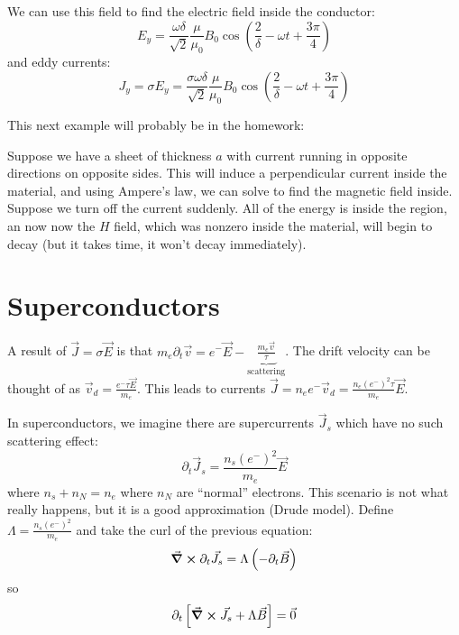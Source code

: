 \documentclass[a4paper,twoside,master.tex]{subfiles}
\begin{document}
We can use this field to find the electric field inside the conductor:
\begin{equation}
    E_y = \frac{\omega \delta}{\sqrt{2}} \frac{\mu}{\mu_0} B_0 \cos\left( \frac{2}{\delta} - \omega t + \frac{3 \pi}{4} \right)
\end{equation}
and eddy currents:
\begin{equation}
    J_y = \sigma E_y = \frac{\sigma \omega \delta}{\sqrt{2}} \frac{\mu}{\mu_0} B_0 \cos\left( \frac{2}{\delta} - \omega t + \frac{3 \pi}{4} \right)
\end{equation}

This next example will probably be in the homework:
\begin{ex}
    Suppose we have a sheet of thickness $ a $ with current running in opposite directions on opposite sides. This will induce a perpendicular current inside the material, and using Ampere's law, we can solve to find the magnetic field inside. Suppose we turn off the current suddenly. All of the energy is inside the region, an now now the $ H $ field, which was nonzero inside the material, will begin to decay (but it takes time, it won't decay immediately).
\end{ex}

\section{Superconductors}
\label{sec:superconductors}

A result of $ \vec{J} = \sigma \vec{E} $ is that $ m_e \partial_t \vec{v} = e^- \vec{E} -\underbrace{ \frac{m_e \vec{v}}{\tau}}_{\text{scattering}} $. The drift velocity can be thought of as $ \vec{v}_d = \frac{e^- \tau \vec{E}}{m_e} $. This leads to currents $ \vec{J} = n_e e^- \vec{v}_d = \frac{n_e (e^-)^2 \tau}{m_e} \vec{E} $.

In superconductors, we imagine there are supercurrents $ \vec{J}_s $ which have no such scattering effect:
\begin{equation}
    \partial_t \vec{J}_s = \frac{n_s (e^-)^2}{m_e} \vec{E}
\end{equation}
where $ n_s + n_N = n_e $ where $ n_N $ are ``normal'' electrons. This scenario is not what really happens, but it is a good approximation (Drude model). Define $ \Lambda = \frac{n_s (e^-)^2}{m_e} $ and take the curl of the previous equation:
\begin{equation}
    \curl{\partial_t \vec{J}_s} = \Lambda \left( -\partial_t \vec{B} \right)
\end{equation}
so
\begin{equation}
    \partial_t \left[ \curl{ \vec{J}_s} + \Lambda \vec{B} \right] = \vec{0}
\end{equation}
\end{document}
